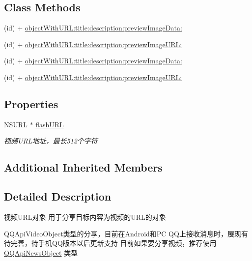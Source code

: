 \subsection*{Class Methods}
\begin{DoxyCompactItemize}
\item 
(id) + \mbox{\hyperlink{interface_q_q_api_video_object_a2efc425ba6d89d7c5c6b88f152c72b3b}{object\+With\+U\+R\+L\+:title\+:description\+:preview\+Image\+Data\+:}}
\item 
(id) + \mbox{\hyperlink{interface_q_q_api_video_object_a8e2ef5c242834e8ebf7ebc1207ab519f}{object\+With\+U\+R\+L\+:title\+:description\+:preview\+Image\+U\+R\+L\+:}}
\item 
(id) + \mbox{\hyperlink{interface_q_q_api_video_object_a2efc425ba6d89d7c5c6b88f152c72b3b}{object\+With\+U\+R\+L\+:title\+:description\+:preview\+Image\+Data\+:}}
\item 
(id) + \mbox{\hyperlink{interface_q_q_api_video_object_a8e2ef5c242834e8ebf7ebc1207ab519f}{object\+With\+U\+R\+L\+:title\+:description\+:preview\+Image\+U\+R\+L\+:}}
\end{DoxyCompactItemize}
\subsection*{Properties}
\begin{DoxyCompactItemize}
\item 
\mbox{\label{interface_q_q_api_video_object_a4e040d561aaa024fb234da240e8de8be}} 
N\+S\+U\+RL $\ast$ \mbox{\hyperlink{interface_q_q_api_video_object_a4e040d561aaa024fb234da240e8de8be}{flash\+U\+RL}}
\begin{DoxyCompactList}\small\item\em 视频\+U\+R\+L地址，最长512个字符 \end{DoxyCompactList}\end{DoxyCompactItemize}
\subsection*{Additional Inherited Members}


\subsection{Detailed Description}
视频\+U\+R\+L对象 用于分享目标内容为视频的\+U\+R\+L的对象 

Q\+Q\+Api\+Video\+Object类型的分享，目前在\+Android和\+PC Q\+Q上接收消息时，展现有待完善，待手机\+Q\+Q版本以后更新支持 目前如果要分享视频，推荐使用 \mbox{\hyperlink{interface_q_q_api_news_object}{Q\+Q\+Api\+News\+Object}} 类型 

